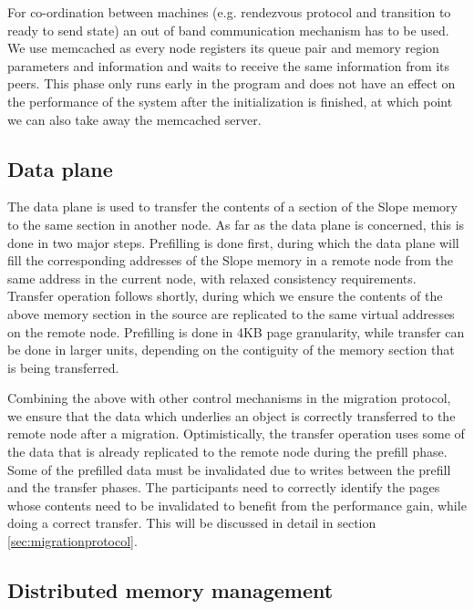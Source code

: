 For co-ordination between machines (e.g. rendezvous protocol and transition
to ready to send state)
an out of band communication mechanism has to be used. We use memcached as
every node registers its queue pair and memory region parameters and
information and waits to receive the same information from its peers. This
phase only runs early in the program and does not have an effect on the
performance of the system after the initialization is finished, at which point
we can also take away the memcached server.

\subsection{Data plane}

The data plane is used to transfer the contents of a section of the Slope
memory to the same section in another node. As far as the data plane is
concerned, this is done in two major steps. Prefilling is done first, during
which the data plane will fill the corresponding addresses of the
Slope memory in a remote node from the same address in the current node, with
relaxed consistency requirements. Transfer operation follows shortly, during
which we ensure the contents of the above memory section in the source are
replicated to the same virtual addresses on the remote node. Prefilling is done
in 4KB page granularity, while transfer can be done in larger units, depending
on the contiguity of the memory section that is being transferred.

Combining the above with other control mechanisms in the migration protocol, we
ensure that the data which underlies an object is correctly transferred to the
remote node after a migration. Optimistically, the transfer operation uses some
of the data that is already replicated to the remote node during the prefill
phase. Some of the prefilled data must be invalidated due to writes between the
prefill and the transfer phases. The participants need to correctly identify
the pages whose contents need to be invalidated to benefit from the performance
gain, while doing a correct transfer. This will be discussed in detail in section
\ref{sec:migrationprotocol}.

\subsection{Distributed memory management}


